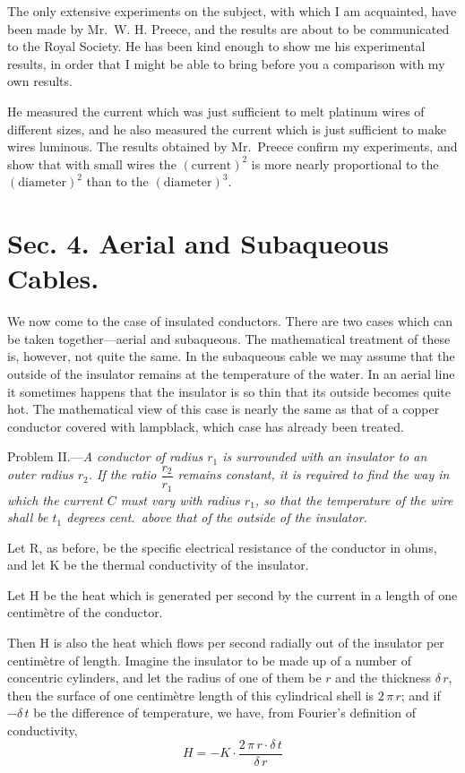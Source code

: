 \documentclass[12pt,oneside]{book}[2021/10/04]
\newenvironment{letlist}{\begin{description}[leftmargin=4em, itemindent=-2em]}{\end{description}}
\begin{document}
The only extensive experiments on the subject, with which I
am acquainted, have been made by Mr.\ W. H. Preece, and the
results are about to be communicated to the Royal Society. He
has been kind enough to show me his experimental results, in order
that I might be able to bring before you a comparison with my
own results.

He measured the current which was just sufficient to melt
platinum wires of different sizes, and he also measured the current
which is just sufficient to make wires luminous. The results
obtained by Mr.\ Preece confirm my experiments, and show that
with small wires the \((\mathrm{current})^2\) is more nearly proportional to the
\((\mathrm{diameter})^2\) than to the \((\mathrm{diameter})^3\).

\section*{Sec. 4. Aerial and Subaqueous Cables.}

We now come to the case of insulated conductors. There
are two cases which can be taken together—aerial and subaqueous.
The mathematical treatment of these is, however, not
quite the same. In the subaqueous cable we may assume that the
outside of the insulator remains at the temperature of the water.
In an aerial line it sometimes happens that the insulator is so thin
that its outside becomes quite hot. The mathematical view of
this case is nearly the same as that of a copper conductor covered
with lampblack, which case has already been treated.

Problem II.—\textit{A conductor of radius \(r_{1}\) is surrounded with an
insulator to an outer radius \(r_{2}\). If the ratio \(\dfrac{r_2}{r_1}\) remains constant,
it is required to find the way in which the current \(C\) must vary
with radius \(r_{1}\), so that the temperature of the wire shall be \(t_{1}\)
degrees cent.\ above that of the outside of the insulator.}

\begin{letlist}
\item[] Let R, as before, be the specific electrical resistance of the
conductor in ohms, and let K be the thermal conductivity
of the insulator.
\item[] Let H be the heat which is generated per second by the
current in a length of one centimètre of the conductor.
\end{letlist}
Then H is also the heat which flows per second radially out of the
insulator per centimètre of length. Imagine the insulator to be
made up of a number of concentric cylinders, and let the radius
of one of them be \(r\) and the thickness \(\delta\,r\), then the surface of one
centimètre length of this cylindrical shell is \(2 \,\pi \,r\); and if \(- \delta \,t\)
be the difference of temperature, we have, from Fourier's definition
of conductivity,
\[
H = -K \cdot \frac{2 \,\pi \,r \cdot \delta \,t}{ \delta \,r}
\]
\end{document}
